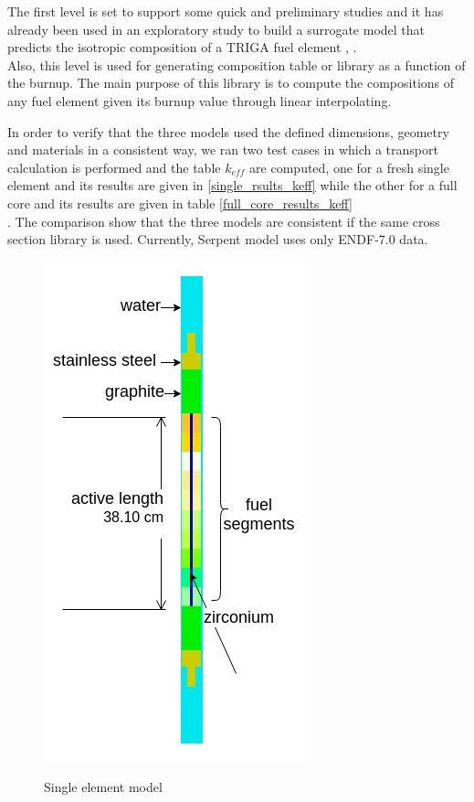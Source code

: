 \documentclass[review,number,sort&compress,12pt]{elsarticle}
\begin{document}
The first level is set to support some quick and preliminary studies and it has already been used in an exploratory study to build a surrogate model that predicts the isotropic composition of a TRIGA fuel element \cite{abdo2018dds}, \cite{elzohery2018cbg}.\\
Also, this level is used for generating composition table or library as a function of the burnup. The main purpose of this library is to compute the compositions of any fuel element  given its burnup value through linear interpolating.

In order to verify that the three models used the defined dimensions, geometry and materials in a consistent way, we ran two test cases in which a transport calculation is performed and the table $k_{eff}$ are computed, one for a fresh single element and its results are given in \ref{single_rsults_keff} while the other for a full core and its results are given in table \ref{full_core_results_keff} \\.
The comparison show that the three models are consistent if the same cross section library is used. Currently, Serpent model uses only ENDF-7.0 data.


\begin{figure}[h]
\centering
\includegraphics[scale=0.5]{single_element.jpg}\\
\caption{Single element model}
\label{fig:sigle_element_model}
\end{figure}
\end{document}
